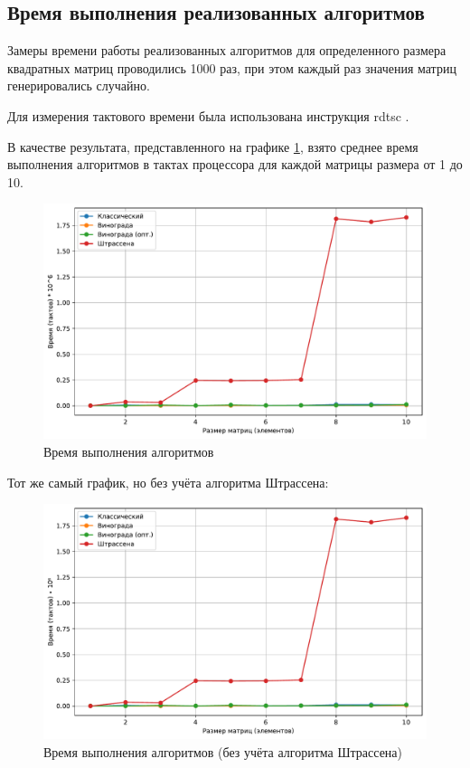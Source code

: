 \newpage

\subsection{Время выполнения реализованных алгоритмов}
Замеры времени работы реализованных алгоритмов для определенного размера квадратных матриц проводились 1000 раз, при этом каждый раз значения матриц генерировались случайно.

Для измерения тактового времени была использована инструкция rdtsc \cite{microsoft_rdtsc}.

В качестве результата, представленного на графике \ref{fig:timefull}, взято среднее время выполнения алгоритмов в тактах процессора для каждой матрицы размера от 1 до 10.

\begin{figure}
	\centering
	\includegraphics[width=0.9\linewidth]{../src/lab_02/timefull}
	\caption{Время выполнения алгоритмов}
	\label{fig:timefull}
\end{figure}

Тот же самый график, но без учёта алгоритма Штрассена:

\begin{figure}
	\centering
	\includegraphics[width=0.9\linewidth]{../src/lab_02/time}
	\caption{Время выполнения алгоритмов (без учёта алгоритма Штрассена)}
	\label{fig:time}
\end{figure}


